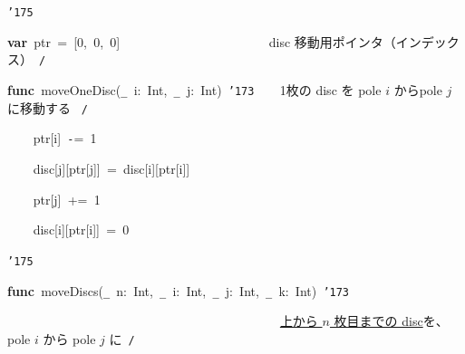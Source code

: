 \documentclass[a4paper,10pt]{article}
\def\mc{\relax}
\begin{document}
\noindent
\mbox{}{\tt\char'175}

\noindent
\mbox{}\hfill

\noindent
\mbox{}\textbf{var}{\tt\mc \ }ptr{\tt\mc \ }={\tt\mc \ }[0,{\tt\mc \ }0,{\tt\mc \ }0]{\tt\mc \ }{\tt\mc \ }{\tt\mc \ }{\tt\mc \ }{\tt\mc \ }{\tt\mc \ }{\tt\mc \ }{\tt\mc \ }{\tt\mc \ }{\tt\mc \ }{\tt\mc \ }{\tt\mc \ }{\tt\mc \ }{\tt\mc \ }{\tt\mc \ }{\tt\mc \ }{\tt\mc \ }{\tt\mc \ }{\tt\mc \ }{\tt\mc \ }{\tt\mc \ }\rm\mc {\tt /}{\tt *}\  \ disc 移動用ポインタ（インデックス）\hfill \rm\mc \ {\tt *}{\tt /}
\tt\mc 

\noindent
\mbox{}\hfill

\noindent
\mbox{}\textbf{func}{\tt\mc \ }moveOneDisc({\tt\_}{\tt\mc \ }i:{\tt\mc \ }Int,{\tt\mc \ }{\tt\_}{\tt\mc \ }j:{\tt\mc \ }Int){\tt\mc \ }{\tt\char'173}{\tt\mc \ }{\tt\mc \ }\rm\mc {\tt /}{\tt *}\  \ 1枚の disc を pole $i$ からpole $j$ に移動する \hfill \rm\mc \ {\tt *}{\tt /}
\tt\mc 

\noindent
\mbox{}{\tt\mc \ }{\tt\mc \ }{\tt\mc \ }{\tt\mc \ }ptr[i]{\tt\mc \ }{\tt -}={\tt\mc \ }1

\noindent
\mbox{}{\tt\mc \ }{\tt\mc \ }{\tt\mc \ }{\tt\mc \ }disc[j][ptr[j]]{\tt\mc \ }={\tt\mc \ }disc[i][ptr[i]]

\noindent
\mbox{}{\tt\mc \ }{\tt\mc \ }{\tt\mc \ }{\tt\mc \ }ptr[j]{\tt\mc \ }+={\tt\mc \ }1

\noindent
\mbox{}{\tt\mc \ }{\tt\mc \ }{\tt\mc \ }{\tt\mc \ }disc[i][ptr[i]]{\tt\mc \ }={\tt\mc \ }0

\noindent
\mbox{}{\tt\char'175}

\noindent
\mbox{}\hfill

\noindent
\mbox{}\textbf{func}{\tt\mc \ }moveDiscs({\tt\_}{\tt\mc \ }n:{\tt\mc \ }Int,{\tt\mc \ }{\tt\_}{\tt\mc \ }i:{\tt\mc \ }Int,{\tt\mc \ }{\tt\_}{\tt\mc \ }j:{\tt\mc \ }Int,{\tt\mc \ }{\tt\_}{\tt\mc \ }k:{\tt\mc \ }Int){\tt\mc \ }{\tt\char'173}

\noindent
\mbox{}{\tt\mc \ }{\tt\mc \ }{\tt\mc \ }{\tt\mc \ }{\tt\mc \ }{\tt\mc \ }{\tt\mc \ }{\tt\mc \ }{\tt\mc \ }{\tt\mc \ }{\tt\mc \ }{\tt\mc \ }{\tt\mc \ }{\tt\mc \ }{\tt\mc \ }{\tt\mc \ }{\tt\mc \ }{\tt\mc \ }{\tt\mc \ }{\tt\mc \ }{\tt\mc \ }{\tt\mc \ }{\tt\mc \ }{\tt\mc \ }{\tt\mc \ }{\tt\mc \ }{\tt\mc \ }{\tt\mc \ }{\tt\mc \ }{\tt\mc \ }{\tt\mc \ }{\tt\mc \ }{\tt\mc \ }{\tt\mc \ }{\tt\mc \ }{\tt\mc \ }{\tt\mc \ }{\tt\mc \ }{\tt\mc \ }{\tt\mc \ }\rm\mc {\tt /}{\tt *}\  \ \underline{\textsf{上から $n$ 枚目までの disc}}を、pole $i$ から pole $j$ に\hfill \rm\mc \ {\tt *}{\tt /}
\tt\mc 
\end{document}
